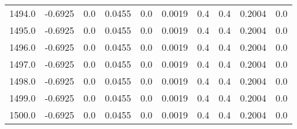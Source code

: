 \begin{longtable}{lrrrrrrrrr}
1494.0 & -0.6925 & 0.0 & 0.0455 & 0.0 & 0.0019 & 0.4 & 0.4 & 0.2004 & 0.0 \\
1495.0 & -0.6925 & 0.0 & 0.0455 & 0.0 & 0.0019 & 0.4 & 0.4 & 0.2004 & 0.0 \\
1496.0 & -0.6925 & 0.0 & 0.0455 & 0.0 & 0.0019 & 0.4 & 0.4 & 0.2004 & 0.0 \\
1497.0 & -0.6925 & 0.0 & 0.0455 & 0.0 & 0.0019 & 0.4 & 0.4 & 0.2004 & 0.0 \\
1498.0 & -0.6925 & 0.0 & 0.0455 & 0.0 & 0.0019 & 0.4 & 0.4 & 0.2004 & 0.0 \\
1499.0 & -0.6925 & 0.0 & 0.0455 & 0.0 & 0.0019 & 0.4 & 0.4 & 0.2004 & 0.0 \\
1500.0 & -0.6925 & 0.0 & 0.0455 & 0.0 & 0.0019 & 0.4 & 0.4 & 0.2004 & 0.0 \\
\end{longtable}